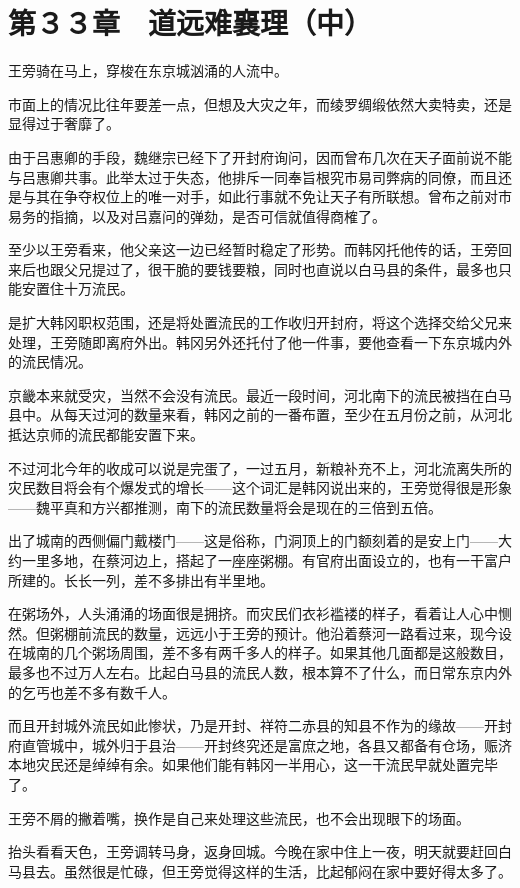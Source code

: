 \section{第３３章　道远难襄理（中）}

王旁骑在马上，穿梭在东京城汹涌的人流中。

市面上的情况比往年要差一点，但想及大灾之年，而绫罗绸缎依然大卖特卖，还是显得过于奢靡了。

由于吕惠卿的手段，魏继宗已经下了开封府询问，因而曾布几次在天子面前说不能与吕惠卿共事。此举太过于失态，他排斥一同奉旨根究市易司弊病的同僚，而且还是与其在争夺权位上的唯一对手，如此行事就不免让天子有所联想。曾布之前对市易务的指摘，以及对吕嘉问的弹劾，是否可信就值得商榷了。

至少以王旁看来，他父亲这一边已经暂时稳定了形势。而韩冈托他传的话，王旁回来后也跟父兄提过了，很干脆的要钱要粮，同时也直说以白马县的条件，最多也只能安置住十万流民。

是扩大韩冈职权范围，还是将处置流民的工作收归开封府，将这个选择交给父兄来处理，王旁随即离府外出。韩冈另外还托付了他一件事，要他查看一下东京城内外的流民情况。

京畿本来就受灾，当然不会没有流民。最近一段时间，河北南下的流民被挡在白马县中。从每天过河的数量来看，韩冈之前的一番布置，至少在五月份之前，从河北抵达京师的流民都能安置下来。

不过河北今年的收成可以说是完蛋了，一过五月，新粮补充不上，河北流离失所的灾民数目将会有个爆发式的增长——这个词汇是韩冈说出来的，王旁觉得很是形象——魏平真和方兴都推测，南下的流民数量将会是现在的三倍到五倍。

出了城南的西侧偏门戴楼门——这是俗称，门洞顶上的门额刻着的是安上门——大约一里多地，在蔡河边上，搭起了一座座粥棚。有官府出面设立的，也有一干富户所建的。长长一列，差不多排出有半里地。

在粥场外，人头涌涌的场面很是拥挤。而灾民们衣衫褴褛的样子，看着让人心中恻然。但粥棚前流民的数量，远远小于王旁的预计。他沿着蔡河一路看过来，现今设在城南的几个粥场周围，差不多有两千多人的样子。如果其他几面都是这般数目，最多也不过万人左右。比起白马县的流民人数，根本算不了什么，而日常东京内外的乞丐也差不多有数千人。

而且开封城外流民如此惨状，乃是开封、祥符二赤县的知县不作为的缘故——开封府直管城中，城外归于县治——开封终究还是富庶之地，各县又都备有仓场，赈济本地灾民还是绰绰有余。如果他们能有韩冈一半用心，这一干流民早就处置完毕了。

王旁不屑的撇着嘴，换作是自己来处理这些流民，也不会出现眼下的场面。

抬头看看天色，王旁调转马身，返身回城。今晚在家中住上一夜，明天就要赶回白马县去。虽然很是忙碌，但王旁觉得这样的生活，比起郁闷在家中要好得太多了。

